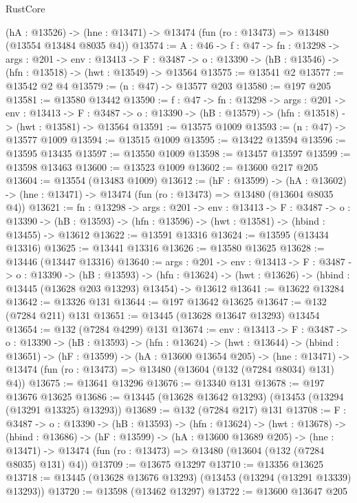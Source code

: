 \begin{lexlean}{RustCore}
\begin{coremodule}
  (hA : @13526) -> (hne : @13471) -> @13474 (fun (ro : @13473) => @13480 (@13554 @13484 @8035 @4))
@13574 := {A : @46} ->
  {f : @47} ->
  {fn : @13298} ->
  {args : @201} ->
  {env : @13413} ->
  {F : @3487} -> {o : @13390} -> (hB : @13546) -> (hfn : @13518) -> (hwt : @13549) -> @13564
@13575 := @13541 @2
@13577 := @13542 @2 @4
@13579 := (n : @47) -> @13577 @203
@13580 := @197 @205
@13581 := @13580 @13442
@13590 := {f : @47} ->
  {fn : @13298} ->
  {args : @201} ->
  {env : @13413} ->
  {F : @3487} -> {o : @13390} -> (hB : @13579) -> (hfn : @13518) -> (hwt : @13581) -> @13564
@13591 := @13575 @1009
@13593 := (n : @47) -> @13577 @1009
@13594 := @13515 @1009
@13595 := @13422 @13594
@13596 := @13595 @13435
@13597 := @13550 @1009
@13598 := @13457 @13597
@13599 := @13598 @13463
@13600 := @13523 @1009
@13602 := @13600 @217 @205
@13604 := @13554 (@13483 @1009)
@13612 := (hF : @13599) ->
  (hA : @13602) -> (hne : @13471) -> @13474 (fun (ro : @13473) => @13480 (@13604 @8035 @4))
@13621 := {fn : @13298} ->
  {args : @201} ->
  {env : @13413} ->
  {F : @3487} ->
  {o : @13390} -> (hB : @13593) -> (hfn : @13596) -> (hwt : @13581) -> (hbind : @13455) -> @13612
@13622 := @13591 @13316
@13624 := @13595 (@13434 @13316)
@13625 := @13441 @13316
@13626 := @13580 @13625
@13628 := @13446 (@13447 @13316)
@13640 := {args : @201} ->
  {env : @13413} ->
  {F : @3487} ->
  {o : @13390} ->
  (hB : @13593) ->
  (hfn : @13624) -> (hwt : @13626) -> (hbind : @13445 (@13628 @203 @13293) @13454) -> @13612
@13641 := @13622 @13284
@13642 := @13326 @131
@13644 := @197 @13642 @13625
@13647 := @132 (@7284 @211) @131
@13651 := @13445 (@13628 @13647 @13293) @13454
@13654 := @132 (@7284 @4299) @131
@13674 := {env : @13413} ->
  {F : @3487} ->
  {o : @13390} ->
  (hB : @13593) ->
  (hfn : @13624) ->
  (hwt : @13644) ->
  (hbind : @13651) ->
  (hF : @13599) ->
  (hA : @13600 @13654 @205) ->
  (hne : @13471) -> @13474 (fun (ro : @13473) => @13480 (@13604 (@132 (@7284 @8034) @131) @4))
@13675 := @13641 @13296
@13676 := @13340 @131
@13678 := @197 @13676 @13625
@13686 := @13445 (@13628 @13642 @13293) (@13453 (@13294 (@13291 @13325) @13293))
@13689 := @132 (@7284 @217) @131
@13708 := {F : @3487} ->
  {o : @13390} ->
  (hB : @13593) ->
  (hfn : @13624) ->
  (hwt : @13678) ->
  (hbind : @13686) ->
  (hF : @13599) ->
  (hA : @13600 @13689 @205) ->
  (hne : @13471) -> @13474 (fun (ro : @13473) => @13480 (@13604 (@132 (@7284 @8035) @131) @4))
@13709 := @13675 @13297
@13710 := @13356 @13625
@13718 := @13445 (@13628 @13676 @13293) (@13453 (@13294 (@13291 @13339) @13293))
@13720 := @13598 (@13462 @13297)
@13722 := @13600 @13647 @205

\end{coremodule}
\end{lexlean}
